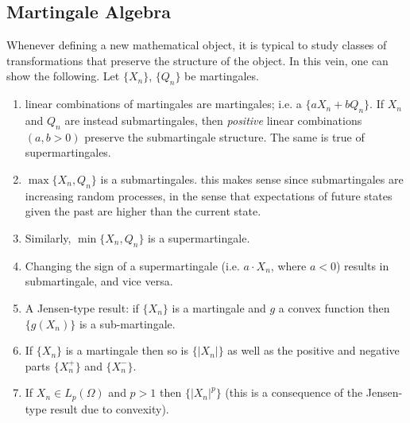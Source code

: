 \documentclass[12pt]{article}
\newcommand*{\abs}[1]{\left\lvert#1\right\rvert}
\begin{document}
\subsection{Martingale Algebra}
Whenever defining a new mathematical object, it is typical to study classes of transformations that preserve the structure of the object. In this vein, one can show the following. 
Let $\{X_n\}$, $\{Q_n\}$ be martingales. 
\begin{enumerate}
\item linear combinations of martingales are martingales; i.e. a $\{a X_n + b Q_n\}$. If $X_n$ and $Q_n$ are instead submartingales, then \textit{positive} linear combinations 
$(a, b > 0)$ preserve the submartingale structure. The same is true of supermartingales.  
\item $\max\{X_n, Q_n\}$ is a submartingales. this makes sense since submartingales are increasing random processes, in the sense that expectations of future states given the 
past are higher than the current state. 
\item Similarly, $\min\{X_n, Q_n\}$ is a supermartingale. 
\item Changing the sign of a supermartingale (i.e. $a \cdot X_n$, where $a < 0$) results in submartingale, and vice versa. 
\item A Jensen-type result: if $\{X_n\}$ is a martingale and $g$ a convex function then $\{g(X_n)\}$ is a sub-martingale. 
\item If $\{X_n\}$ is a martingale then so is $\{\abs{X_n}\}$ as well as the positive and negative parts $\{X_n^+\}$ and $\{X_n^-\}$. 
\item If $X_n \in L_p(\Omega)$ and $p > 1$ then $\{\abs{X_n}^p\}$ (this is a consequence of the Jensen-type result due to convexity). 
\end{enumerate}
\end{document}
